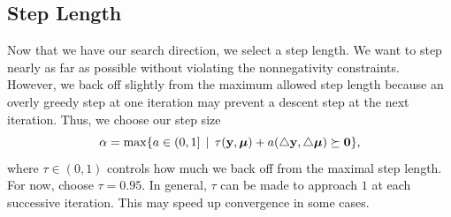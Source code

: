  %

\subsection*{Step Length}
Now that we have our search direction, we select a step length.
 We want to step nearly as far as possible
without violating the nonnegativity constraints.
However, we back off slightly from the maximum allowed step length
because an overly greedy step at one iteration may prevent a descent step at the next iteration.
Thus, we choose our step size
\[
\alpha = \max\{a \in (0,1] \, \mid \, \tau(\mathbf{y},\boldsymbol{\mu}) +a(\triangle \mathbf{y}, \triangle \boldsymbol{\mu}) \succeq \mathbf{0}\},
\]
where $\tau \in (0,1)$ controls how much we back off from the maximal step length.
For now, choose $\tau = 0.95$.
In general, $\tau$ can be made to approach $1$ at each successive iteration.
This may speed up convergence in some cases.

